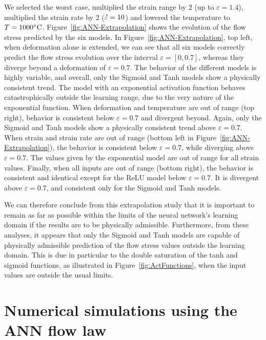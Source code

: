\documentclass[algorithms,article,submit,pdftex,oneauthors]{Definitions/mdpi}
\DeclareRobustCommand{\mdot}[1]{\accentset{\mbox{\bfseries .}}{#1}}
\begin{document}
We selected the worst case, multiplied the strain range by $2$ (up to $\varepsilon=1.4$), multiplied the strain rate by 2 ($\mdot{\varepsilon}=10$) and lowered the temperature to $T=1000\celsius$.
Figure~\ref{fig:ANN-Extrapolation} shows the evolution of the flow stress predicted by the six models.
In Figure~\ref{fig:ANN-Extrapolation}, top left, when deformation alone is extended, we can see that all six models correctly predict the flow stress evolution over the interval $\varepsilon=[0,0.7]$, whereas they diverge beyond a deformation of $\varepsilon=0.7$.
The behavior of the different models is highly variable, and overall, only the Sigmoid and Tanh models show a physically consistent trend.
The model with an exponential activation function behaves catastrophically outside the learning range, due to the very nature of the exponential function.
When deformation and temperature are out of range (top right), behavior is consistent below $\varepsilon=0.7$ and divergent beyond.
Again, only the Sigmoid and Tanh models show a physically consistent trend above $\varepsilon=0.7$.
When strain and strain rate are out of range (bottom left in Figure~\ref{fig:ANN-Extrapolation}), the behavior is consistent below $\varepsilon=0.7$, while diverging above $\varepsilon=0.7$.
The values given by the exponential model are out of range for all strain values.
Finally, when all inputs are out of range (bottom right), the behavior is consistent and identical except for the ReLU model below $\varepsilon=0.7$.
It is divergent above $\varepsilon=0.7$, and consistent only for the Sigmoid and Tanh models.

We can therefore conclude from this extrapolation study that it is important to remain as far as possible within the limits of the neural network's learning domain if the results are to be physically admissible.
Furthermore, from these analyses, it appears that only the Sigmoid and Tanh models are capable of physically admissible prediction of the flow stress values outside the learning domain.
This is due in particular to the double saturation of the tanh and sigmoid functions, as illustrated in Figure~\ref{fig:ActFunctions}, when the input values are outside the usual limits.

\section{Numerical simulations using the ANN flow law}\label{sec:Numerical}
\end{document}
